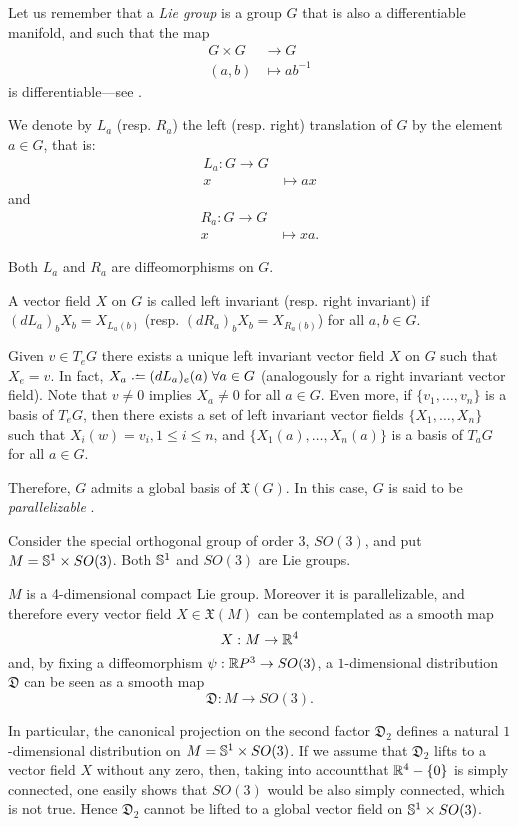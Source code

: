 \begin{remark}
	Let us remember that a \emph{Lie group} is a group $G$ that is also a differentiable manifold, and such that the map
	\begin{align*}
		G \times G &\to G \\
		(a,b) &\mapsto ab^{-1}
	\end{align*}
	is differentiable---see \cite[p. 38]{kobnom63}.
	
	We denote by $L_a$ (resp. $R_a$) the left (resp. right) translation of $G$ by the element $a\in G$, that is:
	\begin{align*}
		L_a \colon G \to G \\
		x &\mapsto ax
	\end{align*}
	and
	\begin{align*}
		R_a \colon G \to G \\
		x &\mapsto xa.
	\end{align*}

	Both $L_a$ and $R_a$ are diffeomorphisms on $G$.
	
	A vector field $X$ on $G$ is called left invariant (resp. right invariant) if $(dL_a)_b X_b = X_{L_a(b)}$ (resp. $(dR_a)_b X_b = X_{R_a(b)}$) for all $a,b \in G$.
	
	Given $v \in T_e G$ there exists a unique left invariant vector field $X$ on $G$ such that $X_e = v$. In fact, $X_a \defeq (dL_a)_e(a) \; \forall a \in G$ (analogously for a right invariant vector field). Note that $v \neq 0$ implies $X_a \neq 0$ for all $a \in G$. Even more, if $\{v_1, \dots, v_n\}$ is a basis of $T_e G$, then there exists a set of left invariant vector fields $\{X_1, \dots, X_n\}$ such that $X_i(w) = v_i, 1 \leq i \leq n$, and  $\{X_1(a), \dots, X_n(a)\}$ is a basis of $T_a G$ for all $a \in G$.
	
	Therefore, $G$ admits a global basis of $\mathfrak{X}(G)$. In this case, $G$ is said to be \emph{parallelizable} \cite[Ch. 1, Sec. 4]{kobnom63}.
\end{remark}

Consider the special orthogonal group of order 3, $SO(3)$, and put $M=\S^{1}\times SO(3)$. Both $\S^1$ and $SO(3)$ are Lie groups.

$M$ is a 4-dimensional compact Lie group. Moreover it is parallelizable, and therefore every vector field $X\in\mathfrak{X}(M)$ can be contemplated as a smooth map $$X:M\rightarrow \R^{4}$$ and, by fixing a diffeomorphism $\psi:\R P^{3}\rightarrow SO(3)$, a $1$-dimensional distribution $\mathfrak{D}$ can be seen as a smooth map $$\mathfrak{D}:M\rightarrow SO(3).$$

In particular, the canonical projection on the second factor $\mathfrak{D}_2$ defines a natural $1$-dimensional distribution on $M=\S^{1}\times SO(3)$. If we assume that $\mathfrak{D}_2$ lifts to a vector field $X$ without any zero, then, taking into accountthat $\R^{4}-\{0\}$ is simply connected, one easily shows that $SO(3)$ would be also simply connected, which is not true. Hence $\mathfrak{D}_2$ cannot be lifted to a global vector field on $\S^{1}\times SO(3)$.
